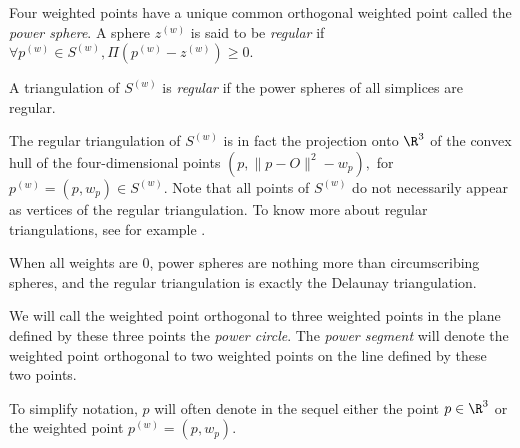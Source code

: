 Four weighted points have a unique common orthogonal weighted point called
the \textit{power sphere}. A sphere ${z}^{(w)}$ is said to be
\textit{regular} if $\forall {p}^{(w)}\in{S}^{(w)},
\Pi{({p}^{(w)}-{z}^{(w)})}\geq 0$.

A triangulation of ${S}^{(w)}$ is \textit{regular} if the power spheres
of all simplices are regular. 

The regular triangulation of
${S}^{(w)}$ is in fact the projection onto $\R^3$ of the convex hull 
of the four-dimensional points $(p,\|p-O\|^2-w_p),$ for
${p}^{(w)}=(p,w_p)\in{S}^{(w)}$. 
Note that all points of ${S}^{(w)}$ do not
necessarily appear as vertices of the regular
triangulation. To know more about regular triangulations, see for
example \cite{es-itfwr-96}. 

When all weights are 0, power spheres are nothing more than
circumscribing spheres, and the regular triangulation is exactly the
Delaunay triangulation.

We will call the weighted point orthogonal to three weighted points in
the plane defined by these three points the \textit{power circle}. The
\textit{power segment} will denote the weighted point orthogonal to
two weighted points on the line defined by these two points.

To simplify notation, $p$ will often denote in the sequel either the
point $p\in\R^3$ or the weighted point ${p}^{(w)}=(p,w_p)$.








